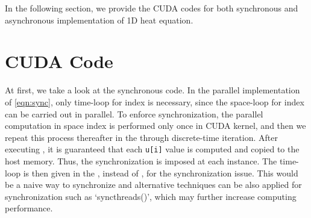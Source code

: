 \documentclass[1p]{elsarticle}
\begin{document}
In the following section, we provide the \textsf{CUDA} codes for both synchronous and asynchronous implementation of 1D heat equation.

\section{\textsf{CUDA} Code}


At first, we take a look at the synchronous code. In the parallel implementation of \eqref{eqn:sync}, only time-loop for index  is necessary, since the space-loop for index  can be carried out in parallel. To enforce synchronization, the parallel computation in space index  is performed only once in \textsf{CUDA} kernel, and then we repeat this process thereafter in the  through discrete-time iteration. After executing , it is guaranteed that each \texttt{u[i]} value is computed and copied to the host memory. Thus, the synchronization is imposed at each instance. The time-loop is then given in the , instead of , for the synchronization issue. This would be a naive way to synchronize and alternative techniques can be also applied for synchronization such as `\textsf{\underbar{  }\underbar{ }syncthreads()}', which may further increase computing performance. 
\end{document}
